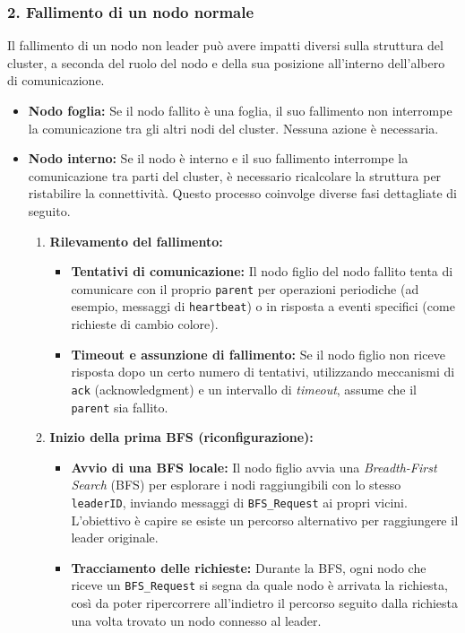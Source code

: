 \documentclass[12pt, a4paper]{report}
\begin{document}
\subsubsection{2. Fallimento di un nodo normale}
\label{sec:fallimento_nodo_normale}
Il fallimento di un nodo non leader pu\`o avere impatti diversi sulla struttura del cluster, a seconda del ruolo del nodo e della sua posizione all'interno dell'albero di comunicazione.

\begin{itemize}
    \item \textbf{Nodo foglia:} Se il nodo fallito \`e una foglia, il suo fallimento non interrompe la comunicazione tra gli altri nodi del cluster. Nessuna azione \`e necessaria.
    
    \item \textbf{Nodo interno:} Se il nodo \`e interno e il suo fallimento interrompe la comunicazione tra parti del cluster, \`e necessario ricalcolare la struttura per ristabilire la connettivit\`a. Questo processo coinvolge diverse fasi dettagliate di seguito.

    \newpage
    \begin{enumerate}
        \item \textbf{Rilevamento del fallimento:}
        \begin{itemize}
            \item \textbf{Tentativi di comunicazione:} Il nodo figlio del nodo fallito tenta di comunicare con il proprio \texttt{parent} per operazioni periodiche (ad esempio, messaggi di \texttt{heartbeat}) o in risposta a eventi specifici (come richieste di cambio colore).
            \item \textbf{Timeout e assunzione di fallimento:} Se il nodo figlio non riceve risposta dopo un certo numero di tentativi, utilizzando meccanismi di \texttt{ack} (acknowledgment) e un intervallo di \textit{timeout}, assume che il \texttt{parent} sia fallito.
        \end{itemize}
        
        \item \textbf{Inizio della prima BFS (riconfigurazione):}
        \begin{itemize}
            \item \textbf{Avvio di una BFS locale:} Il nodo figlio avvia una \textit{Breadth-First Search} (BFS) per esplorare i nodi raggiungibili con lo stesso \texttt{leaderID}, inviando messaggi di \texttt{BFS\_Request} ai propri vicini. L'obiettivo \`e capire se esiste un percorso alternativo per raggiungere il leader originale.
            \item \textbf{Tracciamento delle richieste:} Durante la BFS, ogni nodo che riceve un \texttt{BFS\_Request} si segna da quale nodo \`e arrivata la richiesta, così da poter ripercorrere all'indietro il percorso seguito dalla richiesta una volta trovato un nodo connesso al leader.
        \end{itemize}
        

\end{enumerate}
\end{itemize}
\end{document}

